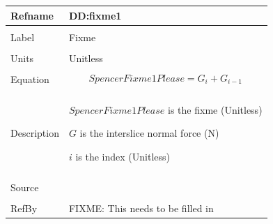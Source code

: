 \documentclass[12pt]{article}
\begin{document}
\noindent \begin{minipage}{\textwidth}
\begin{tabular}{p{} p{}}
\toprule \textbf{Refname} & \textbf{DD:fixme1}
\label{DD:fixme1}
\\ \midrule \\
Label & Fixme
\\ \midrule \\
Units & Unitless
\\ \midrule \\
Equation & \begin{dmath}
           SpencerFixme1Please=G_{i}+G_{i-1}
           \end{dmath}
\\ \midrule \\
Description & \begin{symbDescription}
              \item{$SpencerFixme1Please$ is the fixme (Unitless)}
              \item{$G$ is the interslice normal force (N)}
              \item{$i$ is the index (Unitless)}
              \end{symbDescription}
\\ \midrule \\
Source &
\\ \midrule \\
RefBy & FIXME: This needs to be filled in
\\ \bottomrule \end{tabular}
\end{minipage}\\
~\newline
\end{document}
